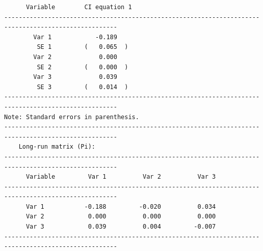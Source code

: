 \documentclass[article]{jss}
\begin{document}
\begin{verbatim}
      Variable        CI equation 1  
-----------------------------------------------------------------------------------------------------
        Var 1            -0.189     
         SE 1         (   0.065  )  
        Var 2             0.000     
         SE 2         (   0.000  )  
        Var 3             0.039     
         SE 3         (   0.014  )  
-----------------------------------------------------------------------------------------------------
Note: Standard errors in parenthesis.                                                                
-----------------------------------------------------------------------------------------------------
    Long-run matrix (Pi):                                                                       
-----------------------------------------------------------------------------------------------------
      Variable         Var 1          Var 2          Var 3   
-----------------------------------------------------------------------------------------------------
      Var 1           -0.188         -0.020          0.034    
      Var 2            0.000          0.000          0.000    
      Var 3            0.039          0.004         -0.007    
-----------------------------------------------------------------------------------------------------


\end{verbatim}
\end{document}
